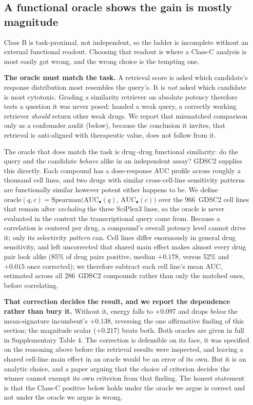 \documentclass[11pt,letterpaper]{article}
\newcommand{\CTXLINES}{966}
\newcommand{\NGDSCDRUGS}{286}
\newcommand{\CENTERUNCEN}{85\% of drug pairs positive, median $+0.178$, versus 52\% and
  $+0.015$ once corrected}
\begin{document}
\subsection*{A functional oracle shows the gain is mostly magnitude}

Class B is task-proximal, not independent, so the ladder is incomplete without an external
functional readout. Choosing that readout is where a Class-C analysis is most easily got wrong,
and the wrong choice is the tempting one.

\textbf{The oracle must match the task.} A retrieval score is asked which candidate's response
distribution most resembles the query's. It is \emph{not} asked which candidate is most
cytotoxic. Grading a similarity retriever on absolute potency therefore tests a question it was
never posed: handed a weak query, a correctly working retriever \emph{should} return other weak
drugs. We report that mismatched comparison only as a confounder audit (below), because the
conclusion it invites, that retrieval is anti-aligned with therapeutic value, does not follow
from it.

The oracle that does match the task is drug--drug functional similarity: do the query
and the candidate \emph{behave} alike in an independent assay? GDSC2\cite{GDSC,GDSCLandscape} supplies this directly.
Each compound has a dose-response AUC profile across roughly a thousand cell lines, and two
drugs with similar cross-cell-line sensitivity patterns are functionally similar however potent
either happens to be. We define
$\mathrm{oracle}(q,c) = \mathrm{Spearman}\big(\mathrm{AUC}_{\bullet}(q),\,
\mathrm{AUC}_{\bullet}(c)\big)$ over the \CTXLINES\ GDSC2 cell lines that remain after
\emph{excluding} the three SciPlex3 lines, so the oracle is never evaluated in the context the
transcriptional query came from. Because a correlation is centered per drug, a compound's
overall potency level cannot drive it; only its selectivity \emph{pattern} can. Cell lines
differ enormously in general drug sensitivity, and left uncorrected that shared main effect makes
almost every drug pair look alike (\CENTERUNCEN); we therefore subtract each cell line's mean AUC,
estimated across all \NGDSCDRUGS\ GDSC2 compounds rather than only the matched ones, before
correlating.

\textbf{That correction decides the result, and we report the dependence rather than bury it.}
Without it, energy falls to $+0.097$ and drops \emph{below} the mean-signature incumbent's
$+0.138$, reversing the one affirmative finding of this section; the magnitude scalar
($+0.217$) beats both. Both oracles are given in full in Supplementary Table 4. The correction is
defensible on its face, it was specified on the reasoning above before the retrieval results were
inspected, and leaving a shared cell-line main effect in an oracle would be an error of its own.
But it is an analytic choice, and a paper arguing that the choice of criterion decides the winner
cannot exempt its own criterion from that finding. The honest statement is that the Class-C
positive below holds under the oracle we argue is correct and not under the oracle we argue is
wrong.
\end{document}
